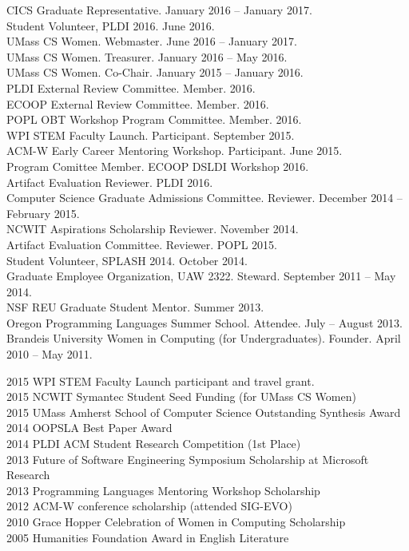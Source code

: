 \documentclass[10pt]{article}
\newcommand{\cvsec}[2]{
    \begin{tcolorbox}[width=\textwidth, breakable, title={#1}]
        #2
    \end{tcolorbox}
    \vspace{10pt}
}
\begin{document}
\cvsec{Professional Activities and Service}{
  CICS Graduate Representative. January 2016 -- January 2017.\\
  Student Volunteer, PLDI 2016. June 2016. \\
  UMass CS Women. Webmaster. June 2016 -- January 2017.\\
  UMass CS Women. Treasurer. January 2016 -- May 2016.\\
  UMass CS Women. Co-Chair. January 2015 -- January 2016.\\
  PLDI External Review Committee.  Member.  2016.\\
  ECOOP External Review Committee.  Member.  2016.\\
  POPL OBT Workshop Program Committee.  Member.  2016.\\
  WPI STEM Faculty Launch.  Participant.  September 2015.\\
  ACM-W Early Career Mentoring Workshop.  Participant.  June 2015.\\
  Program Comittee Member. ECOOP DSLDI Workshop 2016. \\
  Artifact Evaluation Reviewer. PLDI 2016. \\
  Computer Science Graduate Admissions Committee. Reviewer. December 2014 -- February 2015.\\
  NCWIT Aspirations Scholarship Reviewer. November 2014. \\
  Artifact Evaluation Committee. Reviewer. POPL 2015.\\
  Student Volunteer, SPLASH 2014. October 2014.\\
  Graduate Employee Organization, UAW 2322. Steward. September 2011 -- May 2014.\\
  NSF REU Graduate Student Mentor. Summer 2013.\\
  Oregon Programming Languages Summer School. Attendee. July -- August 2013.	\\
  Brandeis University Women in Computing (for Undergraduates). Founder. April 2010 -- May 2011. 
}


\cvsec{Honors, Scholarships, and Awards}{
  2015 WPI STEM Faculty Launch participant and travel grant.\\
  2015 NCWIT Symantec Student Seed Funding (for UMass CS Women)\\
  2015 UMass Amherst School of Computer Science Outstanding Synthesis Award\\
  2014 OOPSLA Best Paper Award\\
  2014 PLDI ACM Student Research Competition (1st Place)\\
  2013 Future of Software Engineering Symposium Scholarship at Microsoft Research\\
  2013 Programming Languages Mentoring Workshop Scholarship\\
  2012 ACM-W conference scholarship (attended SIG-EVO)\\
  2010 Grace Hopper Celebration of Women in Computing Scholarship\\
  2005 Humanities Foundation Award in English Literature\\
}
\end{document}
